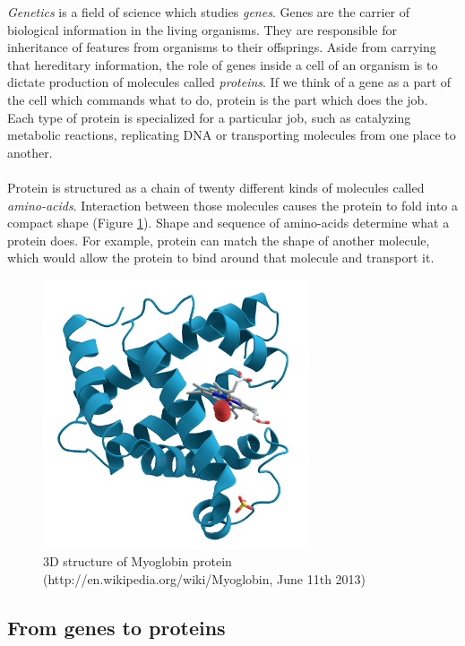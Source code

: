\documentclass[times, utf8, diplomski]{fer}
\begin{document}
\emph{Genetics} is a field of science which studies \emph{genes}. Genes are the carrier of biological information in the living organisms. They are responsible for inheritance of features from organisms to their offsprings. Aside from carrying that hereditary information, the role of genes inside a cell of an organism is to dictate production of molecules called \emph{proteins}. If we think of a gene as a part of the cell which commands what to do, protein is the part which does the job. Each type of protein is specialized for a particular job, such as catalyzing metabolic reactions, replicating  DNA or transporting molecules from one place to another.
\\
\\
Protein is structured as a chain of twenty different kinds of molecules called \emph{amino-acids}. Interaction between those molecules causes the protein to fold into a compact shape (Figure \ref{myoglobin}). Shape and sequence of amino-acids determine what a protein does. For example, protein can match the shape of another molecule, which would allow the protein to bind around that molecule and transport it.

\begin{figure}[!ht]
\begin{center}
	\includegraphics[width=0.7\textwidth]{../img/Myoglobin.png}
	\caption{3D structure of Myoglobin protein (http://en.wikipedia.org/wiki/Myoglobin, June 11th 2013)}\label{myoglobin}
\end{center}
\end{figure}

\subsection{From genes to proteins}
\end{document}
